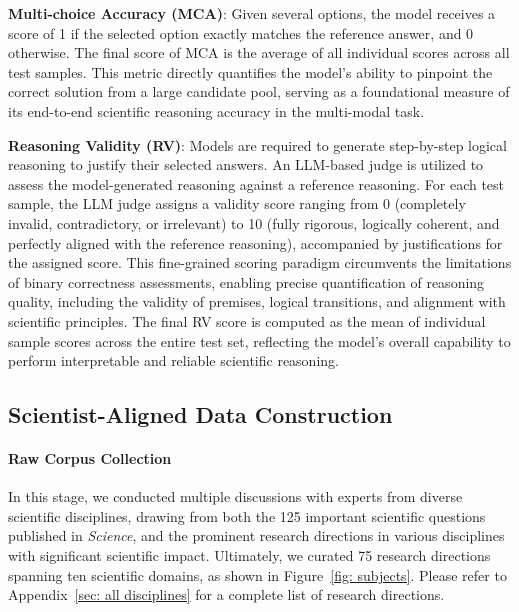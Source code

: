 \begin{tcolorbox}[
    breakable,
    title=Metric Definition of MCA,
    colback=LighterGray,
    colframe=DeepPurple,
    colbacktitle=DeepPurple,
    coltitle=White
]
\textbf{Multi-choice Accuracy (MCA)}: Given several options, the model receives a score of 1 if the selected option exactly matches the reference answer, and 0 otherwise.
The final score of MCA is the average of all individual scores across all test samples. 
This metric directly quantifies the model's ability to pinpoint the correct solution from a large candidate pool, serving as a foundational measure of its end-to-end scientific reasoning accuracy in the multi-modal task.
\end{tcolorbox}

\begin{tcolorbox}[
    breakable,
    title=Metric Definition of Reasoning Validity,
    colback=LighterGray,
    colframe=DeepPurple,
    colbacktitle=DeepPurple,
    coltitle=White
]
\textbf{Reasoning Validity (RV)}: 
Models are required to generate step-by-step logical reasoning to justify their selected answers. 
An LLM-based judge is utilized to assess the model-generated reasoning against a reference reasoning. 
For each test sample, the LLM judge assigns a validity score ranging from 0 (completely invalid, contradictory, or irrelevant) to 10 (fully rigorous, logically coherent, and perfectly aligned with the reference reasoning), accompanied by justifications for the assigned score. 
This fine-grained scoring paradigm circumvents the limitations of binary correctness assessments, enabling precise quantification of reasoning quality, including the validity of premises, logical transitions, and alignment with scientific principles. 
The final RV score is computed as the mean of individual sample scores across the entire test set, reflecting the model's overall capability to perform interpretable and reliable scientific reasoning.
\end{tcolorbox}


\subsection{Scientist-Aligned Data Construction}

\paragraph{Raw Corpus Collection}  
In this stage, we conducted multiple discussions with experts from diverse scientific disciplines, drawing from both the 125 important scientific questions published in \textit{Science}, and the prominent research directions in various disciplines with significant scientific impact. Ultimately, we curated 75 research directions spanning ten scientific domains, as shown in Figure~\ref{fig: subjects}. Please refer to Appendix~\ref{sec: all disciplines} for a complete list of research directions.

